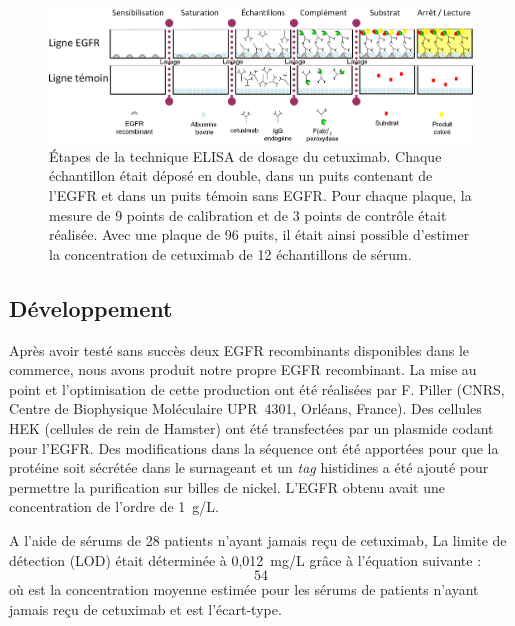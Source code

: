 \begin{landscape}
\begin{figure}[htbp]
	\centering
		\includegraphics[width=20cm]{figures/raster/FIG_17}
	\caption[Étapes de la technique ELISA de dosage du cetuximab.]{Étapes de la technique ELISA de dosage du cetuximab. Chaque échantillon était déposé en double, dans un puits contenant de l'EGFR et dans un puits témoin sans EGFR. Pour chaque plaque, la mesure de 9 points de calibration et de 3 points de contrôle était réalisée. Avec une plaque de 96 puits, il était ainsi possible d'estimer la concentration de cetuximab de 12 échantillons de sérum.}
	\label{fig:17}
\end{figure}
\end{landscape}

\subsection{Développement}
Après avoir testé sans succès deux EGFR recombinants disponibles dans le commerce, nous avons produit notre propre EGFR recombinant. La mise au point et l'optimisation de cette production ont été réalisées par F. Piller (CNRS, Centre de Biophysique Moléculaire UPR~4301, Orléans, France). Des cellules HEK (cellules de rein de Hamster) ont été transfectées par un plasmide codant pour l'EGFR. Des modifications dans la séquence ont été apportées pour que la protéine soit sécrétée dans le surnageant et un \textit{tag} histidines a été ajouté pour permettre la purification sur billes de nickel. L'EGFR obtenu avait une concentration de l'ordre de 1~g/L.

A l'aide de sérums de 28 patients n'ayant jamais reçu de cetuximab, La limite de détection (LOD) était déterminée à 0,012~mg/L grâce à l'équation suivante :
\begin{equation}
54
\end{equation}
où  est la concentration moyenne estimée pour les sérums de patients n'ayant jamais reçu de cetuximab et  est l'écart-type. 


